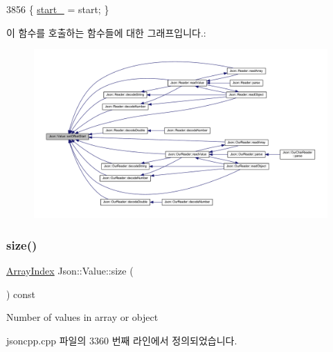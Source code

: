 \begin{DoxyCode}
3856 \{ \hyperlink{class_json_1_1_value_a1c3aeb0fa8fefe93776cb347c76a25a8}{start\_} = start; \}
\end{DoxyCode}
이 함수를 호출하는 함수들에 대한 그래프입니다.\+:\nopagebreak
\begin{figure}[H]
\begin{center}
\leavevmode
\includegraphics[width=350pt]{class_json_1_1_value_a92e32ea0f4f8a15853a3cf0beac9feb9_icgraph}
\end{center}
\end{figure}
\mbox{\label{class_json_1_1_value_a0ec2808e1d7efa4e9fad938d6667be44}} 
\subsubsection{\texorpdfstring{size()}{size()}}
{\footnotesize\ttfamily \hyperlink{class_json_1_1_value_a184a91566cccca7b819240f0d5561c7d}{Array\+Index} Json\+::\+Value\+::size (\begin{DoxyParamCaption}{ }\end{DoxyParamCaption}) const}



Number of values in array or object 



jsoncpp.\+cpp 파일의 3360 번째 라인에서 정의되었습니다.


